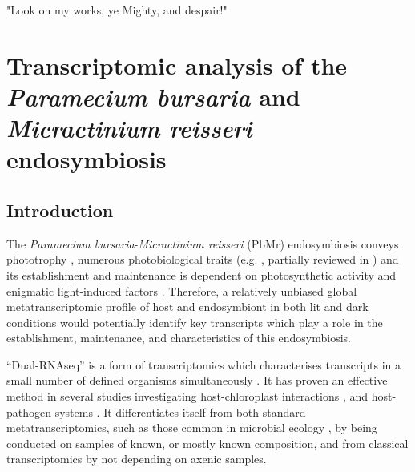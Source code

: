 \graphicspath{{chapters/4.Chapter_2/figures/}}

\begin{savequote}[75mm]
"Look on my works, ye Mighty, and despair!"
\end{savequote}

\chapter{Transcriptomic analysis of the \textit{Paramecium bursaria} and \textit{Micractinium reisseri} endosymbiosis}


\section{Introduction}

The \textit{Paramecium bursaria}-\textit{Micractinium reisseri} (PbMr) endosymbiosis 
conveys phototrophy \citep{Karakashian1963}, numerous photobiological traits (e.g. \citep{Berk1991,Saji1974,Nakajima1989,Niess1982a,Iwatsuki1988,Summerer2009}, 
partially reviewed in \citep{Sommaruga2009}) and its establishment and maintenance 
is dependent on photosynthetic activity and enigmatic light-induced factors \citep{Karakashian1963,Hosoya1995a,Kodama2007,Kodama2014c}.
Therefore, a relatively unbiased global metatranscriptomic profile of host and endosymbiont in both lit and dark conditions 
would potentially identify key transcripts which play a role in the establishment, maintenance, and characteristics 
of this endosymbiosis. 


``Dual-RNAseq'' is a form of transcriptomics which characterises transcripts in a small number of defined organisms simultaneously \citep{Westermann2012}.
It has proven an effective method in several studies investigating host-chloroplast interactions \citep{Nowack2011,Jiggins2013,Xiang2015},
and host-pathogen systems \citep{Tierney2012,Kawahara2012,Jones2014,Hayden2014}.
It differentiates itself from both standard metatranscriptomics, such as those common in microbial ecology \citep{Poretsky2005,AliagaGoltsman2014},
by being conducted on samples of known, or mostly known composition, and from classical transcriptomics
by not depending on axenic samples. 


